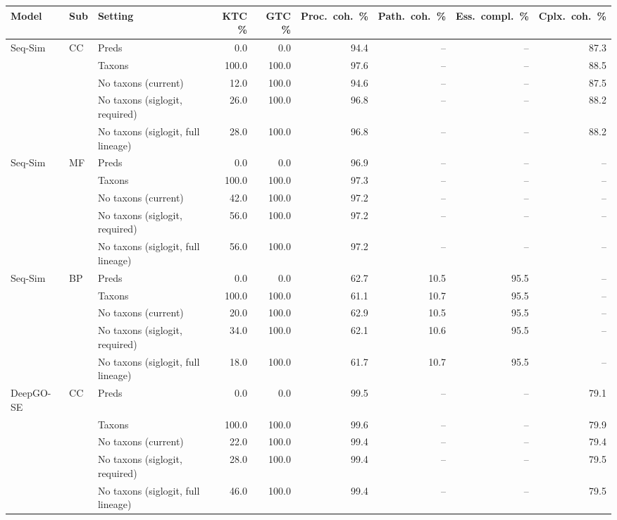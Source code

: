 \begin{tabular}{lllrrrrrr}
\toprule
Model & Sub & Setting & KTC \% & GTC \% & Proc.\ coh.\ \% & Path.\ coh.\ \% & Ess.\ compl.\ \% & Cplx.\ coh.\ \% \\
\midrule
Seq-Sim & CC & Preds & 0.0 & 0.0 & 94.4 & -- & -- & 87.3 \\
 &  & Taxons & 100.0 & 100.0 & 97.6 & -- & -- & 88.5 \\
 &  & No taxons (current) & 12.0 & 100.0 & 94.6 & -- & -- & 87.5 \\
 &  & No taxons (siglogit, required) & 26.0 & 100.0 & 96.8 & -- & -- & 88.2 \\
 &  & No taxons (siglogit, full lineage) & 28.0 & 100.0 & 96.8 & -- & -- & 88.2 \\
\addlinespace
Seq-Sim & MF & Preds & 0.0 & 0.0 & 96.9 & -- & -- & -- \\
 &  & Taxons & 100.0 & 100.0 & 97.3 & -- & -- & -- \\
 &  & No taxons (current) & 42.0 & 100.0 & 97.2 & -- & -- & -- \\
 &  & No taxons (siglogit, required) & 56.0 & 100.0 & 97.2 & -- & -- & -- \\
 &  & No taxons (siglogit, full lineage) & 56.0 & 100.0 & 97.2 & -- & -- & -- \\
\addlinespace
Seq-Sim & BP & Preds & 0.0 & 0.0 & 62.7 & 10.5 & 95.5 & -- \\
 &  & Taxons & 100.0 & 100.0 & 61.1 & 10.7 & 95.5 & -- \\
 &  & No taxons (current) & 20.0 & 100.0 & 62.9 & 10.5 & 95.5 & -- \\
 &  & No taxons (siglogit, required) & 34.0 & 100.0 & 62.1 & 10.6 & 95.5 & -- \\
 &  & No taxons (siglogit, full lineage) & 18.0 & 100.0 & 61.7 & 10.7 & 95.5 & -- \\
\midrule
DeepGO-SE & CC & Preds & 0.0 & 0.0 & 99.5 & -- & -- & 79.1 \\
 &  & Taxons & 100.0 & 100.0 & 99.6 & -- & -- & 79.9 \\
 &  & No taxons (current) & 22.0 & 100.0 & 99.4 & -- & -- & 79.4 \\
 &  & No taxons (siglogit, required) & 28.0 & 100.0 & 99.4 & -- & -- & 79.5 \\
 &  & No taxons (siglogit, full lineage) & 46.0 & 100.0 & 99.4 & -- & -- & 79.5 \\

\end{tabular}
